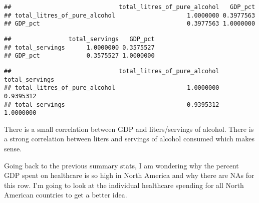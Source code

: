 \documentclass[]{article}
\newenvironment{Shaded}{\begin{snugshade}}{\end{snugshade}}
\newcommand{\KeywordTok}[1]{\textcolor[rgb]{0.13,0.29,0.53}{\textbf{#1}}}
\newcommand{\OperatorTok}[1]{\textcolor[rgb]{0.81,0.36,0.00}{\textbf{#1}}}
\newcommand{\NormalTok}[1]{#1}
\begin{document}
\begin{Shaded}
\end{Shaded}

\begin{verbatim}
##                              total_litres_of_pure_alcohol   GDP_pct
## total_litres_of_pure_alcohol                    1.0000000 0.3977563
## GDP_pct                                         0.3977563 1.0000000
\end{verbatim}

\begin{Shaded}
\end{Shaded}

\begin{verbatim}
##                total_servings   GDP_pct
## total_servings      1.0000000 0.3575527
## GDP_pct             0.3575527 1.0000000
\end{verbatim}

\begin{Shaded}
\end{Shaded}

\begin{verbatim}
##                              total_litres_of_pure_alcohol total_servings
## total_litres_of_pure_alcohol                    1.0000000      0.9395312
## total_servings                                  0.9395312      1.0000000
\end{verbatim}

There is a small correlation between GDP and liters/servings of alcohol.
There is a strong correlation between liters and servings of alcohol
consumed which makes sense.

Going back to the previous summary stats, I am wondering why the percent
GDP spent on healthcare is so high in North America and why there are
NAs for this row. I'm going to look at the individual healthcare
spending for all North American countries to get a better idea.
\end{document}
